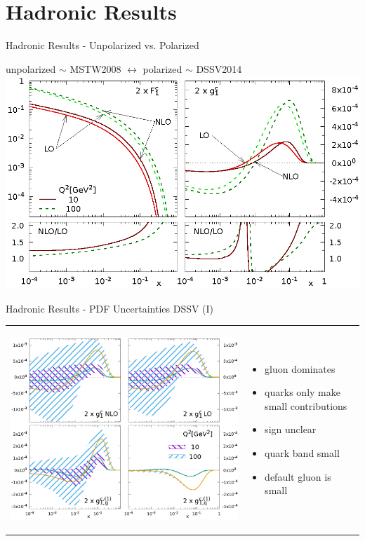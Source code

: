 \section{Hadronic Results}
\begin{frame}{Hadronic Results - Unpolarized vs. Polarized}
\begin{center}
unpolarized $\sim$ MSTW2008 $\leftrightarrow$ polarized $\sim$ DSSV2014\quad\,\,\,
\includegraphics[width=.8\textwidth]{img/F1g1}
\end{center}
\end{frame}

\begin{frame}{Hadronic Results - PDF Uncertainties DSSV (I)}
\begin{tabular}{wn}
\begin{center}
\includegraphics[height=.95\textheight]{img/g1Parts-pdf}
\end{center} & 
\begin{itemize}
\item gluon dominates
\item quarks only make small contributions
\item sign unclear
\item quark band small
\item default gluon is small
\end{itemize}
\end{tabular}
\end{frame}

